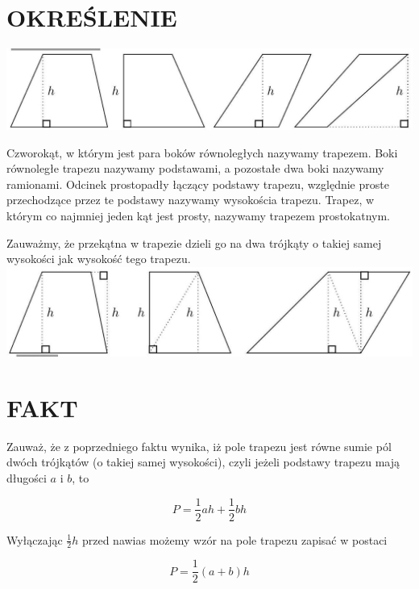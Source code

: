 \documentclass[10pt]{article}
\begin{document}
\section*{OKREŚLENIE}
\begin{center}
\includegraphics[max width=\textwidth]{2024_11_21_8f01584889ff06348ae7g-199}
\end{center}

Czworokąt, w którym jest para boków równoległych nazywamy trapezem. Boki równoległe trapezu nazywamy podstawami, a pozostałe dwa boki nazywamy ramionami. Odcinek prostopadły łączący podstawy trapezu, względnie proste przechodzące przez te podstawy nazywamy wysokościa trapezu. Trapez, w którym co najmniej jeden kąt jest prosty, nazywamy trapezem prostokatnym.

Zauważmy, że przekątna w trapezie dzieli go na dwa trójkąty o takiej samej wysokości jak wysokość tego trapezu.\\
\includegraphics[max width=\textwidth, center]{2024_11_21_8f01584889ff06348ae7g-200}

\section*{FAKT}
Zauważ, że z poprzedniego faktu wynika, iż pole trapezu jest równe sumie pól dwóch trójkątów (o takiej samej wysokości), czyli jeżeli podstawy trapezu mają długości \(a\) i \(b\), to

\[
P=\frac{1}{2} a h+\frac{1}{2} b h
\]

Wyłączając \(\frac{1}{2} h\) przed nawias możemy wzór na pole trapezu zapisać w postaci

\[
P=\frac{1}{2}(a+b) h
\]
\end{document}
